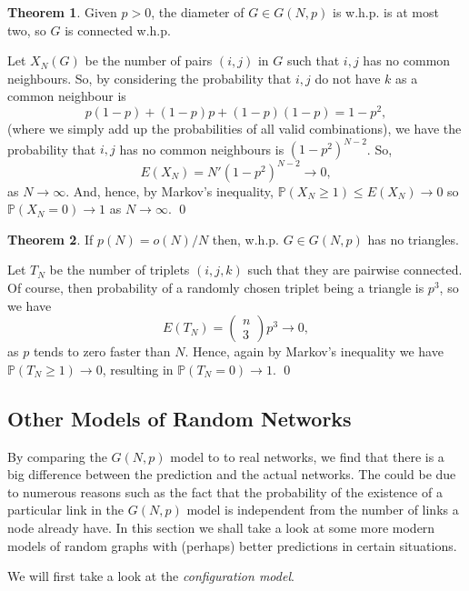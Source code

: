 \documentclass[
]{article}
\theoremstyle{definition}
\newtheorem{theorem}{Theorem}
\theoremstyle{definition}
\begin{document}
\begin{theorem}
  Given \(p > 0\), the diameter of \(G \in G(N, p)\) is w.h.p. is at most two, 
  so \(G\) is connected w.h.p.
\end{theorem}
\proof

Let \(X_N(G)\) be the number of pairs \((i, j)\) in \(G\) such that
\(i, j\) has no common neighbours. So, by considering the probability
that \(i, j\) do not have \(k\) as a common neighbour is
\[ p(1 - p) + (1 - p)p + (1- p)(1 - p) = 1 - p^2,\] (where we simply add
up the probabilities of all valid combinations), we have the probability
that \(i ,j\) has no common neighbours is \((1 - p^2)^{N - 2}\). So,
\[E(X_N) = N'(1 - p^2)^{N - 2} \to 0,\] as \(N \to \infty\). And, hence,
by Markov's inequality, \(\mathbb{P}(X_N \ge 1) \le E(X_N) \to 0\) so
\(\mathbb{P}(X_N = 0) \to 1\) as \(N \to \infty\). \qed

\begin{theorem}
  If \(p(N) = o(N) / N\) then, w.h.p. \(G \in G(N, p)\) has no triangles.
\end{theorem}
\proof

Let \(T_N\) be the number of triplets \((i, j ,k)\) such that they are
pairwise connected. Of course, then probability of a randomly chosen
triplet being a triangle is \(p^3\), so we have
\[E(T_N) = \begin{pmatrix} n \\ 3 \end{pmatrix} p^3 \to 0,\] as \(p\)
tends to zero faster than \(N\). Hence, again by Markov's inequality we
have \(\mathbb{P}(T_N \ge 1) \to 0\), resulting in
\(\mathbb{P}(T_N = 0) \to 1\). \qed

\hypertarget{other-models-of-random-networks}{%
\subsection{Other Models of Random
Networks}\label{other-models-of-random-networks}}

By comparing the \(G(N, p)\) model to to real networks, we find that
there is a big difference between the prediction and the actual
networks. The could be due to numerous reasons such as the fact that the
probability of the existence of a particular link in the \(G(N, p)\)
model is independent from the number of links a node already have. In
this section we shall take a look at some more modern models of random
graphs with (perhaps) better predictions in certain situations.

We will first take a look at the \emph{configuration model}.
\end{document}
